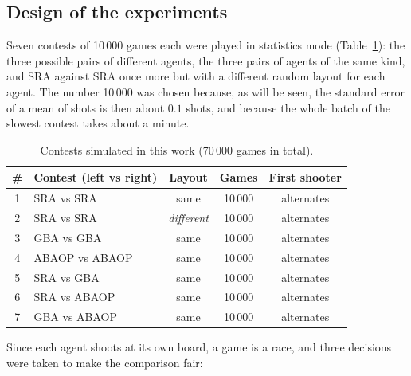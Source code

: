 \documentclass[letterpaper,11pt]{article} %
\renewcommand{\arraystretch}{1.8}
\begin{document}
\subsection{Design of the experiments}
\label{sec:design}

Seven contests of 10\,000 games each were played in statistics mode (Table~\ref{tab:contests}): the three possible pairs of different agents, the three pairs of agents of the same kind, and SRA against SRA once more but with a different random layout for each agent.
The number 10\,000 was chosen because, as will be seen, the standard error of a mean of shots is then about $0.1$ shots, and because the whole batch of the slowest contest takes about a minute.

\begin{table}[H]
    \centering
    \renewcommand{\arraystretch}{1.4}
    \begin{tabular}{|c|l|c|c|c|}
        \hline
        \rowcolor{blue!20}
        \# & Contest (left vs right) & Layout & Games & First shooter \\ \hline
        1 & SRA vs SRA & same & 10\,000 & alternates \\ \hline
        2 & SRA vs SRA & \emph{different} & 10\,000 & alternates \\ \hline
        3 & GBA vs GBA & same & 10\,000 & alternates \\ \hline
        4 & ABAOP vs ABAOP & same & 10\,000 & alternates \\ \hline
        5 & SRA vs GBA & same & 10\,000 & alternates \\ \hline
        6 & SRA vs ABAOP & same & 10\,000 & alternates \\ \hline
        7 & GBA vs ABAOP & same & 10\,000 & alternates \\ \hline
    \end{tabular}
    \caption{Contests simulated in this work (70\,000 games in total).}
    \label{tab:contests}
\end{table}

Since each agent shoots at its own board, a game is a race, and three decisions were taken to make the comparison fair:
\end{document}
